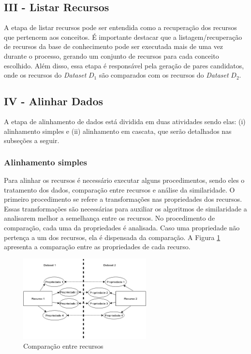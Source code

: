 \subsection{III - Listar Recursos}
A etapa de listar recursos pode ser entendida como a recuperação dos recursos que pertencem aos conceitos. É importante destacar que a listagem/recuperação de recursos da base de conhecimento pode ser executada mais de uma vez durante o processo, gerando um conjunto de recursos para cada conceito escolhido. Além disso, essa etapa é responsável pela geração de pares candidatos, onde os recursos do \textit{Dataset} $D_{1}$ são comparados com os recursos do \textit{Dataset} $D_{2}$.


\subsection{IV - Alinhar Dados}
A etapa de alinhamento de dados está dividida em duas atividades sendo elas: (i) alinhamento simples e (ii) alinhamento em cascata, que serão detalhados nas subseções a seguir.

\subsubsection{Alinhamento simples}
\label{im_simples}
Para alinhar os recursos é necessário executar alguns procedimentos, sendo eles o tratamento dos dados, comparação entre recursos e análise da similaridade. O primeiro procedimento se refere a transformações nas propriedades dos recursos. Essas transformações são necessárias para auxiliar os algoritmos de similaridade a analisarem melhor a semelhança entre os recursos. No procedimento de comparação, cada uma da propriedades é analisada. Caso uma propriedade não pertença a um dos recursos, ela é dispensada da comparação. A Figura  \ref{fig:resources} apresenta a comparação entre as propriedades de cada recurso.

\begin{figure}[!h]
	\centering
	\includegraphics[width=0.6\textwidth]{./imagens/resources.png}
    \caption{Comparação entre recursos}
	\label{fig:resources}
\end{figure}

